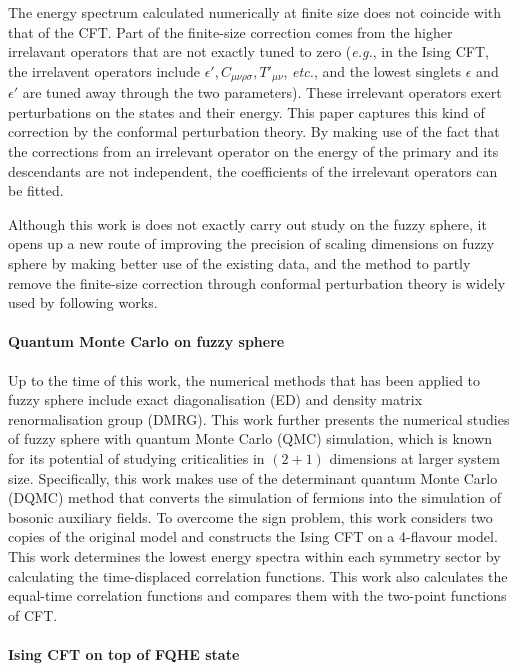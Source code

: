 \documentclass{timesjhep}
\begin{document}
The energy spectrum calculated numerically at finite size does not coincide with that of the CFT. Part of the finite-size correction comes from the higher irrelavant operators that are not exactly tuned to zero (\textit{e.g.}, in the Ising CFT, the irrelavent operators include $\epsilon', C_{\mu\nu\rho\sigma}, T'_{\mu\nu}$, \textit{etc.}, and the lowest singlets $\epsilon$ and $\epsilon'$ are tuned away through the two parameters). These irrelevant operators exert perturbations on the states and their energy. This paper captures this kind of correction by the conformal perturbation theory. By making use of the fact that the corrections from an irrelevant operator on the energy of the primary and its descendants are not independent, the coefficients of the irrelevant operators can be fitted. 

Although this work is does not exactly carry out study on the fuzzy sphere, it opens up a new route of improving the precision of scaling dimensions on fuzzy sphere by making better use of the existing data, and the method to partly remove the finite-size correction through conformal perturbation theory is widely used by following works. 

\paragraph{Quantum Monte Carlo on fuzzy sphere~\cite{Hofmann2023}}

Up to the time of this work, the numerical methods that has been applied to fuzzy sphere include exact diagonalisation (ED) and density matrix renormalisation group (DMRG). This work further presents the numerical studies of fuzzy sphere with quantum Monte Carlo (QMC) simulation, which is known for its potential of studying criticalities in $(2+1)$ dimensions at larger system size. Specifically, this work makes use of the determinant quantum Monte Carlo (DQMC) method that converts the simulation of fermions into the simulation of bosonic auxiliary fields. To overcome the sign problem, this work considers two copies of the original model and constructs the Ising CFT on a 4-flavour model. This work determines the lowest energy spectra within each symmetry sector by calculating the time-displaced correlation functions. This work also calculates the equal-time correlation functions and compares them with the two-point functions of CFT. 

\paragraph{Ising CFT on top of FQHE state~\cite{Voinea2024}}
\end{document}
